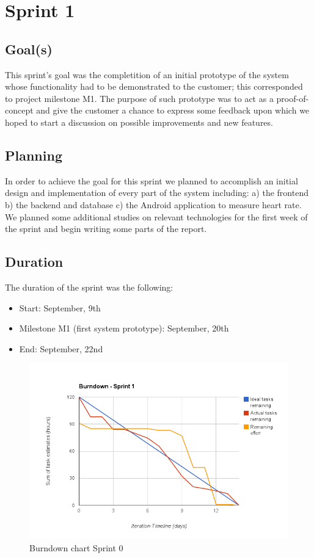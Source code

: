 

\chapter{Sprint 1}
\label{Sprint0}

\section{Goal(s)}
This sprint's goal was the completition of an initial prototype of the system whose functionality
had to be demonstrated to the customer; this corresponded to project milestone M1.
The purpose of such prototype was to act as a proof-of-concept and give the customer
a chance to express some feedback upon which we hoped to start a discussion
on possible improvements and new features.

\section{Planning}
In order to achieve the goal for this sprint we planned to accomplish an initial design
and implementation of every part of the system including:
a) the frontend b) the backend and database c) the Android application to measure heart rate.
We planned some additional studies on relevant technologies for the first week of the sprint
and begin writing some parts of the report.

\section{Duration}
The duration of the sprint was the following:
\begin{itemize}
\item Start: September, 9th
\item Milestone M1 (first system prototype): September, 20th
\item End: September, 22nd
\end{itemize}

\begin{figure}[H]
\centering
\includegraphics[scale=0.60]{../Figures/burndownSprint1.png}
\caption{Burndown chart Sprint 0}
\label{figure:burndownsprint0}
\end{figure}


